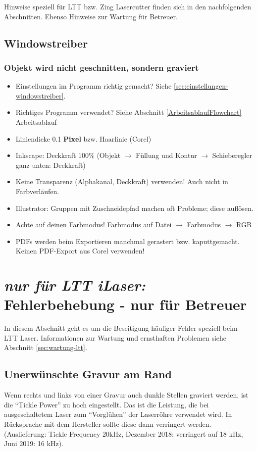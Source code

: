 \documentclass{\basedir/fablab-document}
\newcommand{\nurLTT}{\emph{nur für LTT iLaser:} }
\begin{document}
	Hinweise speziell für LTT bzw. Zing Lasercutter finden sich in den nachfolgenden Abschnitten. Ebenso Hinweise zur Wartung für Betreuer.

	\subsection{Windowstreiber}
	\subsubsection{Objekt wird nicht geschnitten, sondern graviert}
	\begin{itemize}
		\item Einstellungen im Programm richtig gemacht? Siehe \cref{sec:einstellungen-windowstreiber}.
		\item Richtiges Programm verwendet? Siehe Abschnitt \ref{ArbeitsablaufFlowchart} Arbeitsablauf
		\item Liniendicke 0.1 \textbf{Pixel} bzw. Haarlinie (Corel)
		\item Inkscape: Deckkraft 100\% (Objekt $\rightarrow$ Füllung und Kontur $\rightarrow$ Schieberegler ganz unten: Deckkraft)
		\item Keine Transparenz (Alphakanal, Deckkraft) verwenden! Auch nicht in Farbverläufen.
		\item Illustrator: Gruppen mit Zuschneidepfad machen oft Probleme; diese auflösen.
		\item Achte auf deinen Farbmodus! Farbmodus auf Datei $\rightarrow$ Farbmodus $\rightarrow$ RGB
		\item PDFs werden beim Exportieren manchmal gerastert bzw. kaputtgemacht. Keinen PDF-Export aus Corel verwenden!
	\end{itemize}

	\section{\nurLTT Fehlerbehebung - nur für Betreuer}
	In diesem Abschnitt geht es um die Beseitigung häufiger Fehler speziell beim LTT Laser.
	Informationen zur Wartung und ernsthaften Problemen siehe Abschnitt \ref{sec:wartung-ltt}.


	\subsection{Unerwünschte Gravur am Rand}
	Wenn rechts und links von einer Gravur auch dunkle Stellen graviert werden, ist die \enquote{Tickle Power} zu hoch eingestellt. Das ist die Leistung, die bei ausgeschaltetem Laser zum \enquote{Vorglühen} der Laserröhre verwendet wird. In Rücksprache mit dem Hersteller sollte diese dann verringert werden. (Auslieferung: Tickle Frequency 20kHz, Dezember 2018: verringert auf 18 kHz, Juni 2019: 16 kHz).
\end{document}
